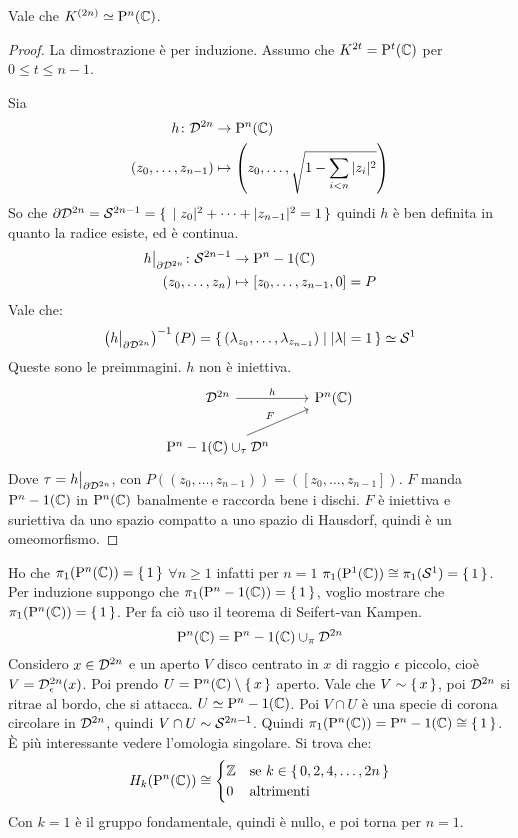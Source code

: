 \begin{proposition}
  Vale che $ K^{(2n)} \simeq \Pjc{n} $.
\end{proposition}
\begin{proof}
  La dimostrazione è per induzione. Assumo che $ K^{2t} = \Pjc{t} $ per $ 0 \leq t \leq n-1 $.

  Sia
  \begin{align*}
    h \colon \Disk{2n} & \to \Pjc{n} \\
    (z_0, \dots, z_{n-1}) & \mapsto \left(z_0,\dots, \sqrt{1 - \sum_{i < n}|z_i|^2} \right)
  \end{align*}
  So che $ \partial \Disk{2n} = \Sph{2n-1} = \set{|z_0|^2 + \dots + |z_{n-1}|^2 = 1} $
  quindi $ h $ è ben definita in quanto la radice esiste, ed è continua.
  \begin{align*}
    h \big \lvert_{\partial \Disk{2n}} \colon \Sph{2n-1} & \to \Pjc{n-1} \\
    (z_0, \dots, z_{n}) & \mapsto [z_0, \dots, z_{n-1}, 0] = P
  \end{align*}
  Vale che:
  \[
    \left( h \big \lvert_{\partial \Disk{2n}}\right)^{-1}(P) = \set{ (\lambda_{z_0}, \dots, \lambda_{z_{n-1}}) | |\lambda| = 1} \simeq \Sph{1}
  \]
  Queste sono le preimmagini. $ h $ non è iniettiva.
  \[
    \begin{tikzcd}
      \Disk{2n} \rar{h} & \Pjc{n} \\
      \Pjc{n-1} \cup_\tau \Disk{n} \arrow{ur}{F} & {}
    \end{tikzcd}
  \]
  Dove $ \tau = h \big \lvert_{\partial \Disk{2n}} $, con $ P((z_0, \dots, z_{n-1})) = ([z_0, \dots, z_{n-1}]) $.
  $ F $ manda $ \Pjc{n-1} $ in $ \Pjc{n} $ banalmente e raccorda bene i dischi.
  $ F $ è iniettiva e suriettiva da uno spazio compatto a uno spazio di Hausdorf,
  quindi è un omeomorfismo.
\end{proof}

Ho che $ \pi_1(\Pjc{n}) = \set{1} $ $ \forall n \geq 1 $
infatti per $ n = 1 $ $ \pi_1(\Pjc{1}) \cong \pi_1(\Sph[1]) = \set{1} $.
Per induzione suppongo che $ \pi_1(\Pjc{n-1}) = \set{1} $, voglio
mostrare che $ \pi_1(\Pjc{n}) = \set{1} $. Per fa ciò
uso il teorema di Seifert-van Kampen.
\[
  \Pjc{n} = \Pjc{n-1} \cup_\pi \Disk{2n}
\]
Considero $ x \in \Disk{2n} $ e un aperto $ V $ disco centrato in $ x $
di raggio $ \epsilon $ piccolo, cioè $ V = \Disk{2n}_\epsilon(x) $. Poi prendo
$ U = \Pjc{n} \setminus \set{x} $ aperto.
Vale che $ V \sim \set{x} $, poi $ \Disk{2n} $ si ritrae al bordo, che
si attacca. $ U \simeq \Pjc{n-1} $.
Poi $ V \cap U $ è una specie di corona circolare in $ \Disk{2n} $,
quindi $ V \cap U \sim \Sph{2n -1} $. Quindi $ \pi_1(\Pjc{n}) = \Pjc{n-1} \cong \set{1} $.
È più interessante vedere l'omologia singolare.
Si trova che:
\[
  H_k(\Pjc{n}) \cong
  \begin{cases}
    \Z & \text{se } k \in \set{0,2,4,\dots, 2n} \\
    0 & \text{altrimenti}
  \end{cases}
\]
Con $ k = 1 $ è il gruppo fondamentale, quindi è nullo, e poi torna per $ n = 1 $.

